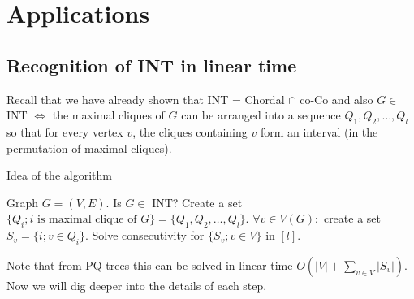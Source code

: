 \section{Applications}

\subsection{Recognition of INT in linear time}

Recall that we have already shown that INT = Chordal $\cap$ co-Co and also $G \in$ INT $\iff$ the maximal cliques of $G$ can be arranged into a sequence $Q_1, Q_2, \dots, Q_l$ so that for every vertex $v$, the cliques containing $v$ form an interval (in the permutation of maximal cliques).

\begin{algorithm}[!ht]
	\caption{Idea of the algorithm}
	\begin{algorithmic}[1]
			\Require Graph $G = (V,E)$.
			\Ensure Is $G \in$ INT?
			\State Create a set $\{Q_{i}; i \text{ is maximal clique of } G\} = \{Q_{1}, Q_{2}, \dots, Q_{l}\}$.
			\State $\forall v \in V(G):$ create a set $S_{v} = \{i; v \in Q_{i}\}$.
			\State Solve consecutivity for $\{S_{v}; v \in V\}$ in $[l]$.
	\end{algorithmic}
\end{algorithm}

Note that from PQ-trees this can be solved in linear time $O(|V| + \sum_{v \in V} |S_{v}|)$. Now we will dig deeper into the details of each step.

